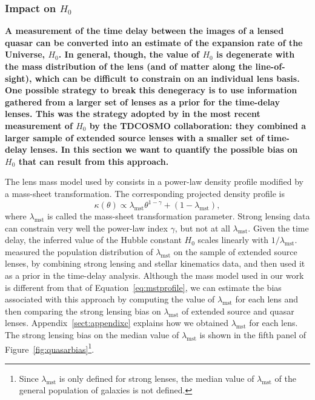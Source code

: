 \documentclass{aa}
\def\lmst{\lambda_{\mathrm{mst}}}
\def\Fref#1{Figure~\ref{#1}\xspace}
\def\Eref#1{Equation~\ref{#1}\xspace}
\begin{document}
\subsubsection{Impact on $H_0$}

{\bf
A measurement of the time delay between the images of a lensed quasar can be converted into an estimate of the expansion rate of the Universe, $H_0$. %
In general, though, the value of $H_0$ is degenerate with the mass distribution of the lens (and of matter along the line-of-sight), which can be difficult to constrain on an individual lens basis.
One possible strategy to break this denegeracy is to use information gathered from a larger set of lenses as a prior for the time-delay lenses.
This was the strategy adopted by \citet{Bir++20} in the most recent measurement of $H_0$ by the TDCOSMO collaboration: they combined a larger sample of extended source lenses with a smaller set of time-delay lenses.
In this section we want to quantify the possible bias on $H_0$ that can result from this approach.

The lens mass model used by \citet{Bir++20} consists in a power-law density profile modified by a mass-sheet transformation. The corresponding projected density profile is
\begin{equation}\label{eq:mstprofile}
\kappa(\theta) \propto \lmst\theta^{1-\gamma} + (1 - \lmst),
\end{equation}
where $\lmst$ is called the mass-sheet transformation parameter.
Strong lensing data can constrain very well the power-law index $\gamma$, but not at all $\lmst$.
Given the time delay, the inferred value of the Hubble constant $H_0$ scales linearly with $1/\lmst$.
\citet{Bir++20} measured the population distribution of $\lmst$ on the sample of extended source lenses, by combining strong lensing and stellar kinematics data, and then used it as a prior in the time-delay analysis.
Although the mass model used in our work is different from that of \Eref{eq:mstprofile}, we can estimate the bias associated with this approach by computing the value of $\lmst$ for each lens and then comparing the strong lensing bias on $\lmst$ of extended source and quasar lenses.
Appendix~\ref{sect:appendixc} explains how we obtained $\lmst$ for each lens. The strong lensing bias on the median value of $\lmst$ is shown in the fifth panel of \Fref{fig:quasarbias}\footnote{Since $\lmst$ is only defined for strong lenses, the median value of $\lmst$ of the general population of galaxies is not defined.}.

}
\end{document}
